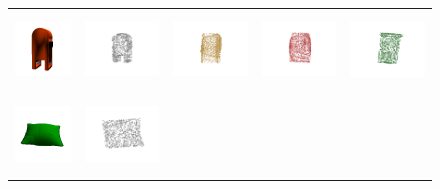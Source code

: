 \documentclass[bachelor, nocolorlinks, printoneside]{seuthesis} %
\begin{document}
\begin{Appendix}{}
\begin{figure}[!h]
\begin{tabular}{c@{}c@{}c@{}c@{}c@{}}
            \vspace{-5mm}
            \includegraphics[width=0.11\columnwidth,height=1.7cm]{figs/supp_real_dataset/Image/mailbox_81f30bae0a1474fff601d2ded3aef05a.png} &
            \includegraphics[width=0.18\columnwidth,height=2cm]{figs/supp_real_dataset/GT/mailbox_81f30bae0a1474fff601d2ded3aef05a_gt.png} &
            \includegraphics[width=0.18\columnwidth,height=2cm]{figs/supp_real_dataset/AE_label/mailbox_81f30bae0a1474fff601d2ded3aef05a_label.png} &
            \includegraphics[width=0.18\columnwidth,height=2cm]{figs/supp_real_dataset/AE/mailbox_81f30bae0a1474fff601d2ded3aef05a_pred.png} &
            \includegraphics[width=0.18\columnwidth,height=2cm]{figs/supp_real_dataset/oracle/mailbox_81f30bae0a1474fff601d2ded3aef05a_oracle.png} \\
            \vspace{-5mm}
            \includegraphics[width=0.12\columnwidth,height=2cm]{figs/supp_real_dataset/Image/pillow_68131b4f51579263f7b57f419ab2620.png} &
            \includegraphics[width=0.18\columnwidth,height=2cm]{figs/supp_real_dataset/GT/pillow_68131b4f51579263f7b57f419ab2620_gt.png} &

\end{tabular}
\end{figure}
\end{Appendix}
\end{document}
